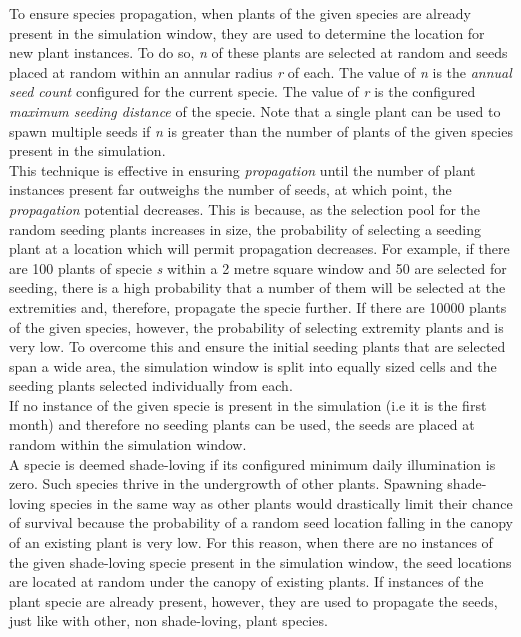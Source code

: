 To ensure species propagation, when plants of the given species are already present in the simulation window, they are used to determine the location for new plant instances. To do so, \textit{n} of these plants are selected at random and seeds placed at random within an annular radius \textit{r} of each. The value of \textit{n} is the \textit{annual seed count} configured for the current specie. The value of \textit{r} is the configured \textit{maximum seeding distance} of the specie. Note that a single plant can be used to spawn multiple seeds if \textit{n} is greater than the number of plants of the given species present in the simulation.\\
This technique is effective in ensuring \textit{propagation} until the number of plant instances present far outweighs the number of seeds, at which point, the \textit{propagation} potential decreases. This is because, as the selection pool for the random seeding plants increases in size, the probability of selecting a seeding plant at a location which will permit propagation decreases. For example, if there are 100 plants of specie \textit{s} within a 2 metre square window and 50 are selected for seeding, there is a high probability that a number of them will be selected at the extremities and, therefore, propagate the specie further. If there are 10000 plants of the given species, however, the probability of selecting extremity plants and is very low. To overcome this and ensure the initial seeding plants that are selected span a wide area, the simulation window is split into equally sized cells and the seeding plants selected individually from each. \\

If no instance of the given specie is present in the simulation (i.e it is the first month) and therefore no seeding plants can be used, the seeds are placed at random within the simulation window.\\ 

A specie is deemed shade-loving if its configured minimum daily illumination is zero. Such species thrive in the undergrowth of other plants. Spawning shade-loving species in the same way as other plants would drastically limit their chance of survival because the probability of a random seed location falling in the canopy of an existing plant is very low. For this reason, when there are no instances of the given shade-loving specie present in the simulation window, the seed locations are located at random under the canopy of existing plants. If instances of the plant specie are already present, however, they are used to propagate the seeds, just like with other, non shade-loving, plant species.

